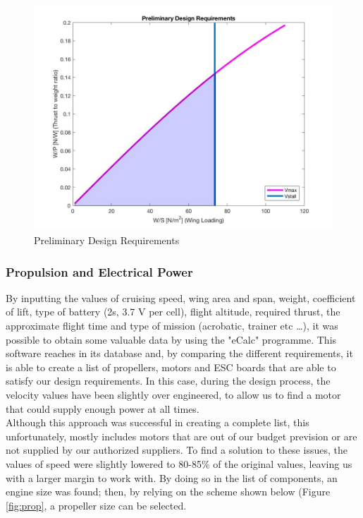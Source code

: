 \documentclass[12pt]{article}
\begin{document}
\begin{figure}[h]
\includegraphics[width=15cm, scale=1]{acdesignreq.png}
\caption{Preliminary Design Requirements}
\label{fig:acdesignreq}
\end{figure}

\newpage

\subsubsection{Propulsion and Electrical Power}

\noindent By inputting the values of cruising speed, wing area and span, weight, coefficient of lift, type of battery (2s, 3.7 V per cell), flight altitude, required thrust, the approximate flight time and  type of mission (acrobatic, trainer etc \ldots), it was possible to obtain some valuable data by using the "eCalc" programme. \cite{ESCREF} This software reaches in its database and, by comparing the different requirements, it is able to create a list of propellers, motors and ESC boards that are able to satisfy our design requirements. In this case, during the design process, the velocity values have been slightly over engineered, to allow us to find a motor that could supply enough power at all times. \\

\noindent Although this approach was successful in creating a complete list, this unfortunately, mostly includes motors that are out of our budget prevision or are not supplied by our authorized suppliers. To find a solution to these issues, the values of speed were slightly lowered to 80-85\% of the original values, leaving us with a larger margin to work with. By doing so in the list of components, an engine size was found; then, by relying on the scheme shown below (Figure \ref{fig:prop}, a propeller size can be selected. 
\end{document}

